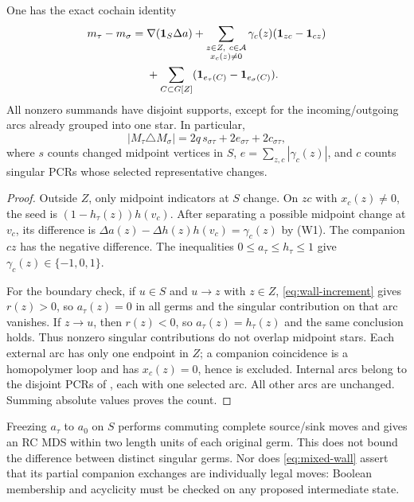 \begin{theorem}\label{thm:mixed-wall}
One has the exact cochain identity
\begin{align}
 m_\tau-m_\sigma={}&\nabla(\mathbf 1_S\Delta a)
 +\sum_{\substack{z\in Z,\ c\in\mathcal A\\x_c(z)\ne0}}
       \gamma_c(z)(\mathbf 1_{zc}-\mathbf 1_{cz}) \notag\\
 &+\sum_{C\subset G[Z]}(\mathbf 1_{e_\tau(C)}-\mathbf 1_{e_\sigma(C)}).
 \label{eq:mixed-wall}
\end{align}
All nonzero summands have disjoint supports, except for the
incoming/outgoing arcs already grouped into one star. In particular,
\[
 |M_\tau\triangle M_\sigma|=2q\,s_{\sigma\tau}
                       +2e_{\sigma\tau}+2c_{\sigma\tau},
\]
where $s$ counts changed midpoint vertices in $S$,
$e=\sum_{z,c}|\gamma_c(z)|$, and $c$ counts singular PCRs whose
selected representative changes.
\end{theorem}
\begin{proof}
Outside $Z$, only midpoint indicators at $S$ change. On $zc$ with
$x_c(z)\ne0$, the seed is $(1-h_\tau(z))h(v_c)$. After separating
a possible midpoint change at $v_c$, its difference is
$\Delta a(z)-\Delta h(z)h(v_c)=\gamma_c(z)$ by (W1).
The companion $cz$ has the negative difference. The inequalities
$0\le a_\tau\le h_\tau\le1$ give $\gamma_c(z)\in\{-1,0,1\}$.

For the boundary check, if $u\in S$ and $u\to z$ with $z\in Z$,
\eqref{eq:wall-increment} gives $r(z)>0$, so $a_\tau(z)=0$
in all germs and the singular contribution on that arc vanishes.
If $z\to u$, then $r(z)<0$, so $a_\tau(z)=h_\tau(z)$ and the
same conclusion holds. Thus nonzero singular contributions do not
overlap midpoint stars. Each external arc has only one endpoint
in $Z$; a companion coincidence is a homopolymer loop and has
$x_c(z)=0$, hence is excluded. Internal arcs belong to the disjoint
PCRs of , each with one selected arc.
All other arcs are unchanged. Summing absolute values proves the count.
\end{proof}
Freezing $a_\tau$ to $a_0$ on $S$ performs commuting complete
source/sink moves and gives an RC MDS within two length units of
each original germ. This does not bound the difference between
distinct singular germs. Nor does \eqref{eq:mixed-wall} assert
that its partial companion exchanges are individually legal moves:
Boolean membership and acyclicity must be checked on any proposed
intermediate state.


